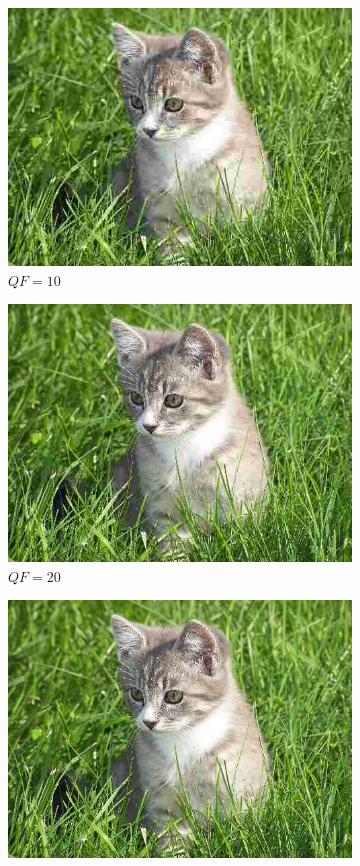 \begin{figure}[ht]
\begin{subfigure}{.33\textwidth}
  \includegraphics[width=.98\linewidth]{../images/compression_examples/qf10}
  \caption{$QF=10$}
\end{subfigure}
\begin{subfigure}{.33\textwidth}
  \centering
  \includegraphics[width=.98\linewidth]{../images/compression_examples/qf20}
  \caption{$QF=20$}
\end{subfigure}%
\begin{subfigure}{.33\textwidth}
  \centering
  \includegraphics[width=.98\linewidth]{../images/compression_examples/qf60}

\end{subfigure}
\end{figure}
